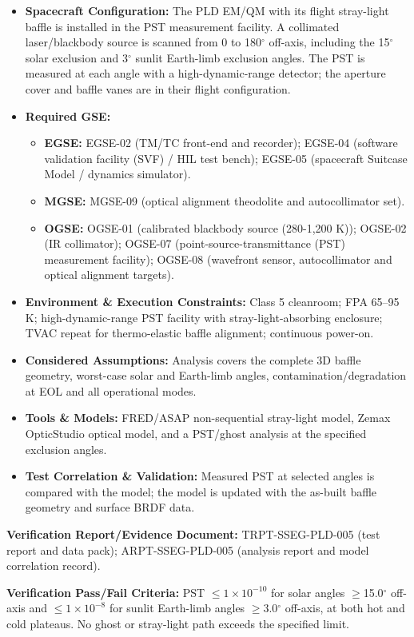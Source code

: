 \begin{itemize}
\item \textbf{Spacecraft Configuration:} The PLD EM/QM with its flight stray-light baffle is installed in the PST measurement facility. A collimated laser/blackbody source is scanned from 0 to 180$^\circ$ off-axis, including the 15$^\circ$ solar exclusion and 3$^\circ$ sunlit Earth-limb exclusion angles. The PST is measured at each angle with a high-dynamic-range detector; the aperture cover and baffle vanes are in their flight configuration.
\item \textbf{Required GSE:}
\begin{itemize}
\item \textbf{EGSE:} EGSE-02 (TM/TC front-end and recorder); EGSE-04 (software validation facility (SVF) / HIL test bench); EGSE-05 (spacecraft Suitcase Model / dynamics simulator).
\item \textbf{MGSE:} MGSE-09 (optical alignment theodolite and autocollimator set).
\item \textbf{OGSE:} OGSE-01 (calibrated blackbody source (280-1,200 K)); OGSE-02 (IR collimator); OGSE-07 (point-source-transmittance (PST) measurement facility); OGSE-08 (wavefront sensor, autocollimator and optical alignment targets).
\end{itemize}
\item \textbf{Environment \& Execution Constraints:} Class 5 cleanroom; FPA 65--95 K; high-dynamic-range PST facility with stray-light-absorbing enclosure; TVAC repeat for thermo-elastic baffle alignment; continuous power-on.
\item \textbf{Considered Assumptions:} Analysis covers the complete 3D baffle geometry, worst-case solar and Earth-limb angles, contamination/degradation at EOL and all operational modes.
\item \textbf{Tools \& Models:} FRED/ASAP non-sequential stray-light model, Zemax OpticStudio optical model, and a PST/ghost analysis at the specified exclusion angles.
\item \textbf{Test Correlation \& Validation:} Measured PST at selected angles is compared with the model; the model is updated with the as-built baffle geometry and surface BRDF data.
\end{itemize}
\par\textbf{Verification Report/Evidence Document:} TRPT-SSEG-PLD-005 (test report and data pack); ARPT-SSEG-PLD-005 (analysis report and model correlation record).
\par\textbf{Verification Pass/Fail Criteria:} PST $\le$$1\times10^{-10}$ for solar angles $\ge$15.0$^\circ$ off-axis and $\le$$1\times10^{-8}$ for sunlit Earth-limb angles $\ge$3.0$^\circ$ off-axis, at both hot and cold plateaus. No ghost or stray-light path exceeds the specified limit.
\par\medskip
